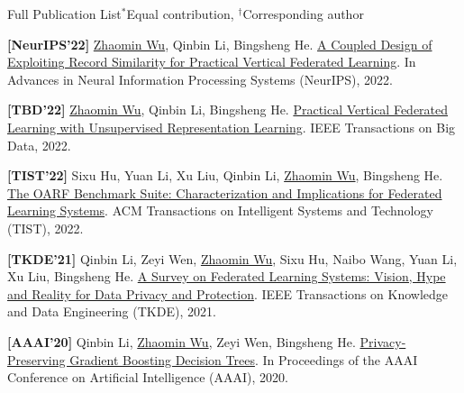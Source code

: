 \begin{rSectionTiny}{Full Publication List}{\(^*\)Equal contribution, \(^\dagger\)Corresponding author}

    {\bf [NeurIPS'22]} \underline{Zhaomin Wu}, Qinbin Li, Bingsheng He. \href{https://proceedings.neurips.cc/paper_files/paper/2022/file/84b744165a0597360caad96b06e69313-Paper-Conference.pdf}{A Coupled Design of Exploiting Record Similarity for Practical Vertical Federated Learning}. In Advances in Neural Information Processing Systems (NeurIPS), 2022.

        {\bf [TBD'22]} \underline{Zhaomin Wu}, Qinbin Li, Bingsheng He. \href{https://doi.org/10.1109/TBDATA.2022.3180117}{Practical Vertical Federated Learning with Unsupervised Representation Learning}. IEEE Transactions on Big Data, 2022.

        {\bf [TIST'22]} Sixu Hu, Yuan Li, Xu Liu, Qinbin Li, \underline{Zhaomin Wu}, Bingsheng He. \href{https://doi.org/10.1145/3510540}{The OARF Benchmark Suite: Characterization and Implications for Federated Learning Systems}. ACM Transactions on Intelligent Systems and Technology (TIST), 2022.


    {\bf [TKDE'21]} Qinbin Li, Zeyi Wen, \underline{Zhaomin Wu}, Sixu Hu, Naibo Wang, Yuan Li, Xu Liu, Bingsheng He. \href{https://doi.org/10.1109/TKDE.2021.3124599}{A Survey on Federated Learning Systems: Vision, Hype and Reality for Data Privacy and Protection}. IEEE Transactions on Knowledge and Data Engineering (TKDE), 2021.


    {\bf [AAAI'20]} Qinbin Li, \underline{Zhaomin Wu}, Zeyi Wen, Bingsheng He. \href{https://doi.org/10.1609/aaai.v34i01.5422}{Privacy-Preserving Gradient Boosting Decision Trees}. In Proceedings of the AAAI Conference on Artificial Intelligence (AAAI), 2020.
\end{rSectionTiny}
